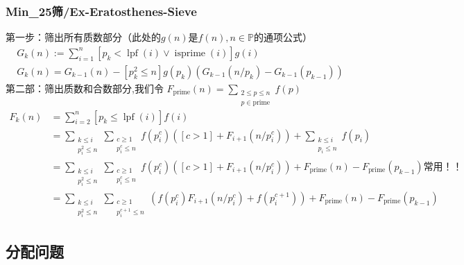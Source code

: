 \subsubsection{Min\_25筛/Ex-Eratosthenes-Sieve}
第一步：筛出所有质数部分（此处的$g(n)$是$f(n),n\in \mathbb{P}$的通项公式）
\begin{equation*}
    \begin{array}{c}
        G_{k}(n):=\sum_{i=1}^{n}\left[p_{k}<\operatorname{lpf}(i) \vee \operatorname{isprime}(i)\right] g(i)\\
        G_{k}(n)=G_{k-1}(n)-\left[p_{k}^{2} \leq n\right] g\left(p_{k}\right)\left(G_{k-1}\left(n / p_{k}\right)-G_{k-1}\left(p_{k-1}\right)\right)
    \end{array}
\end{equation*}
第二部：筛出质数和合数部分,我们令 $F_{\text{prime}}(n)=\sum_{\substack{2\le p\le n\\ p\in \text{prime}}}f(p)$
\begin{equation*}
    \begin{aligned} 
        F_{k}(n) &= \sum_{i = 2}^{n} [p_{k} \le \operatorname{lpf}(i)] f(i) \ \\
        &= \sum_{\substack{k \le i \\ p_{i}^{2} \le n}} \sum_{\substack{c \ge 1 \\ p_{i}^{c} \le n}} f\left(p_{i}^{c}\right) ([c > 1] + F_{i + 1}\left(n / p_{i}^{c}\right)) + \sum_{\substack{k \le i \\ p_{i} \le n}} f(p_{i}) \ \\
        &{= \sum_{\substack{k \le i \\ p_{i}^{2} \le n}} \sum_{\substack{c \ge 1 \\ p_{i}^{c} \le n}} f\left(p_{i}^{c}\right) ([c > 1] + F_{i + 1}\left(n / p_{i}^{c}\right)) + F_{\mathrm{prime}}(n) - F_{\mathrm{prime}}(p_{k - 1})}\text{常用！！} \ \\
        &= \sum_{\substack{k \le i \\ p_{i}^{2} \le n}} \sum_{\substack{c \ge 1 \\ p_{i}^{c + 1} \le n}} \left(f\left(p_{i}^{c}\right) F_{i + 1}\left(n / p_{i}^{c}\right) + f\left(p_{i}^{c + 1}\right)\right) + F_{\mathrm{prime}}(n) - F_{\mathrm{prime}}(p_{k - 1}) 
    \end{aligned}
\end{equation*}





\subsection{分配问题}

